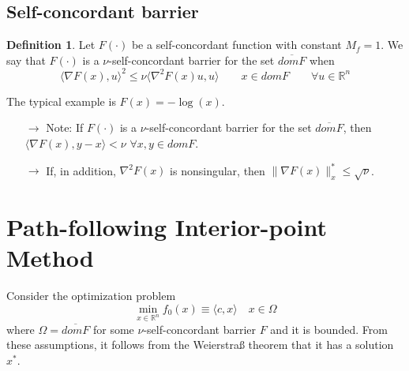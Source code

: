 \documentclass[12pt, openany]{report}
\newcommand{\R}{\mathbb{R}}
\theoremstyle{definition}
\newtheorem{definition}[thm]{Definition}
\begin{document}
\subsection{Self-concordant barrier}
\begin{definition}
	Let $F(\cdot)$ be a self-concordant function with constant $M_f=1$. We say that $F(\cdot)$ is a $\nu$-self-concordant barrier for the set $\overline{dom F}$ when 
	\begin{equation}
		\langle \nabla F(x),u\rangle^2 \le \nu \langle \nabla^2F(x)u,u\rangle \qquad x\in domF\qquad \forall u\in \R^n
	\end{equation}
\end{definition}
The typical example is $F(x)=-\log(x)$. 
\begin{itemize}
	\item [$\to$] Note: If $F(\cdot)$ is a $\nu$-self-concordant barrier for the set $\overline{dom F}$, then $\langle \nabla F(x),y-x\rangle < \nu$ $\forall x,y \in dom F$.
	\item [$\to$] If, in addition, $\nabla^2F(x)$ is nonsingular, then $\|\nabla F(x)\|_x^*\le \sqrt{\nu}$.
\end{itemize}
\section{Path-following Interior-point Method}
Consider the optimization problem 
\begin{equation}\label{eq:problem}
	\min_{x\in \R^n} f_0(x)\equiv \langle c,x\rangle \quad x\in \Omega
\end{equation}
where $\Omega = \overline{domF}$ for some $\nu$-self-concordant barrier $F$ and it is bounded. From these assumptions, it follows from the Weierstraß theorem that it has a solution $x^*$. \\
\end{document}
